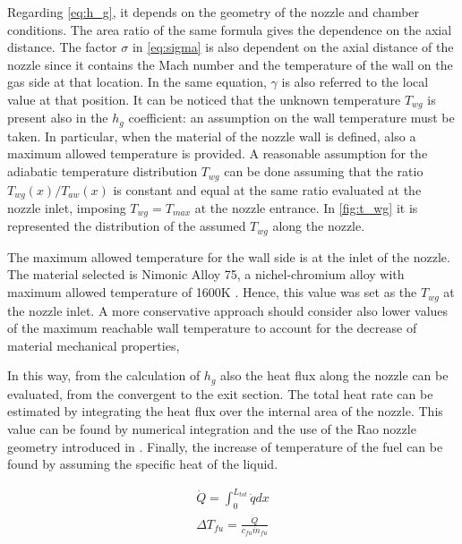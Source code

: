 \vspace{3mm}
Regarding \autoref{eq:h_g}, it depends on the geometry of the nozzle and chamber conditions. The area ratio of the same formula gives the dependence on the axial distance. The factor $\sigma$ in \autoref{eq:sigma} is also dependent on the axial distance of the nozzle since it contains the Mach number and the temperature of the wall on the gas side at that location. In the same equation, $\gamma$ is also referred to the local value at that position. It can be noticed that the unknown temperature $T_{wg}$ is present also in the $h_g$ coefficient: an assumption on the wall temperature must be taken. In particular, when the material of the nozzle wall is defined, also a maximum allowed temperature is provided. A reasonable assumption for the adiabatic temperature distribution  $T_{wg}$ can be done assuming that the ratio  $T_{wg} (x) / T_{aw} (x)$ is constant and equal at the same ratio evaluated at the nozzle inlet, imposing $T_{wg} = T_{max}$ at the nozzle entrance.
In \autoref{fig:t_wg} it is represented the distribution of the assumed $T_{wg}$ along the nozzle.


The maximum allowed temperature for the wall side is at the inlet of the nozzle. The material selected is Nimonic Alloy 75, a nichel-chromium alloy with maximum allowed temperature of 1600K \cite{nimonic}. Hence, this value was set as the $T_{wg}$ at the nozzle inlet. A more conservative approach should consider also lower values of the maximum reachable wall temperature to account for the decrease of material mechanical properties,

In this way, from the calculation of $h_g$ also the heat flux along the nozzle can be evaluated, from the convergent to the exit section.
The total heat rate can be estimated by integrating the heat flux over the internal area of the nozzle. This value can be found by numerical integration and the use of the Rao nozzle geometry introduced in \mref. Finally, the increase of temperature of the fuel can be found by assuming the specific heat of the liquid.

\begin{gather}
    \dot{Q} = \int_{0}^{L_{tot}} \dot{q} dx
    \\
    \Delta T_{fu} = \frac{\dot{Q}}{c_{fu} \dot{m}_{fu}}
\end{gather}

